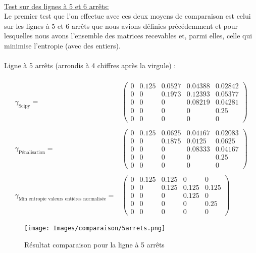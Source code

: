 \documentclass[12pt]{article}
\begin{document}
\\
\underline{Test sur des lignes à 5 et 6 arrêts:}\\
Le premier test que l'on effectue avec ces deux moyens de comparaison est celui sur les lignes à 5 et 6 arrêts que nous avions définies précédemment et pour lesquelles nous avons l'ensemble des matrices recevables et, parmi elles, celle qui minimise l'entropie (avec des entiers).\\
\\
Ligne à 5 arrêts (arrondis à 4 chiffres après la virgule) :\\
\\
\[
\begin{split}
\gamma_{\text{Scipy}} = &
\begin{pmatrix}
0 & 0.125 & 0.0527 & 0.04388 & 0.02842\\
0 & 0 & 0.1973 & 0.12393 & 0.05377 \\
0 & 0 & 0 & 0.08219 & 0.04281 \\
0 & 0 & 0 & 0 & 0.25 \\
0 & 0 & 0 & 0 & 0
\end{pmatrix}\\
\\
\gamma_{\text{Pénalisation}} = &
\begin{pmatrix}
0 & 0.125 & 0.0625 & 0.04167 & 0.02083\\
0 & 0 & 0.1875 & 0.0125 & 0.0625 \\
0 & 0 & 0 & 0.08333 & 0.04167 \\
0 & 0 & 0 & 0 & 0.25 \\
0 & 0 & 0 & 0 & 0
\end{pmatrix}\\
\\
\gamma_{\text{Min entropie valeurs entières normalisée}} = &
\begin{pmatrix}
0 & 0.125 & 0.125 & 0 & 0\\
0 & 0 & 0.125  & 0.125  & 0.125  \\
0 & 0 & 0 & 0.125  & 0 \\
0 & 0 & 0 & 0 & 0.25 \\
0 & 0 & 0 & 0 & 0
\end{pmatrix}
\end{split}
\]
\vspace{0.3cm}
\begin{figure}[H]
    \centering
    \texttt{[image: Images/comparaison/5arrets.png]}
    \caption{Résultat comparaison pour la ligne à 5 arrêts}
\end{figure}
\end{document}
